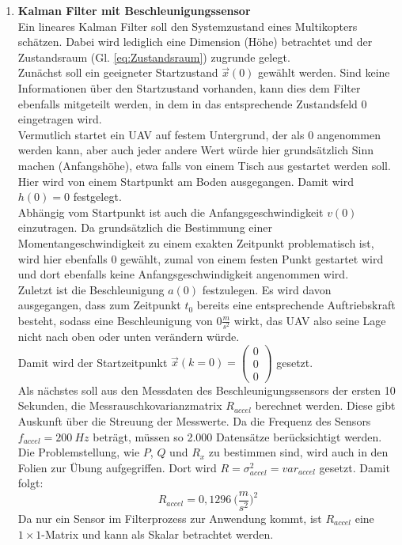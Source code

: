 \documentclass[12pt,a4paper]{article}
\begin{document}
\begin{enumerate}[label=\textbf{\arabic*})]
\begin{enumerate}[label=\textbf{\alph*})]
			\item \textbf{Kalman Filter mit Beschleunigungssensor}\label{subsec:Task1b}\\
			
			Ein lineares Kalman Filter soll den Systemzustand eines Multikopters schätzen. Dabei wird lediglich eine Dimension (Höhe) betrachtet und der Zustandsraum (Gl. \ref{eq:Zustandsraum}) zugrunde gelegt.\\
			
			Zunächst soll ein geeigneter Startzustand $\vec{x}(0)$ gewählt werden. Sind keine Informationen über den Startzustand vorhanden, kann dies dem Filter ebenfalls mitgeteilt werden, in dem in das entsprechende Zustandsfeld $0$ eingetragen wird.\\
			
			Vermutlich startet ein UAV auf festem Untergrund, der als $0$ angenommen werden kann, aber auch jeder andere Wert würde hier grundsätzlich Sinn machen (Anfangshöhe), etwa falls von einem Tisch aus gestartet werden soll. Hier wird von einem Startpunkt am Boden ausgegangen. Damit wird $h(0) = 0$ festgelegt.\\
			
			Abhängig vom Startpunkt ist auch die Anfangsgeschwindigkeit $v(0)$ einzutragen. Da grundsätzlich die Bestimmung einer Momentangeschwindigkeit zu einem exakten Zeitpunkt problematisch ist, wird hier ebenfalls $0$ gewählt, zumal von einem festen Punkt gestartet wird und dort ebenfalls keine Anfangsgeschwindigkeit angenommen wird.\\
			
			Zuletzt ist die Beschleunigung $a(0)$ festzulegen. Es wird davon ausgegangen, dass zum Zeitpunkt $t_{0}$ bereits eine entsprechende Auftriebskraft besteht, sodass eine Beschleunigung von $0 \frac{m}{s^{2}}$ wirkt, das UAV also seine Lage nicht nach oben oder unten verändern würde.\\
			
			Damit wird der Startzeitpunkt $\vec{x}(k=0)=\begin{pmatrix}
				0\\
				0\\
				0
			\end{pmatrix}$
			gesetzt.\\
			
			Als nächstes soll aus den Messdaten des Beschleunigungssensors der ersten 10 Sekunden, die Messrauschkovarianzmatrix $R_{accel}$ berechnet werden. Diese gibt Auskunft über die Streuung der Messwerte. Da die Frequenz des Sensors $f_{accel}=200~Hz$ beträgt, müssen so 2.000 Datensätze berücksichtigt werden. Die Problemstellung, wie $P$, $Q$ und $R_{x}$ zu bestimmen sind, wird auch in den Folien zur Übung aufgegriffen. Dort wird $R=\sigma^{2}_{accel}=var_{accel}$ gesetzt. Damit folgt:
			\begin{equation}\label{eq:Messrauschkovarianzmatrix}
				R_{accel}=0,1296~{(\frac{m}{s^{2}}})^{2}
			\end{equation}
			Da nur ein Sensor im Filterprozess zur Anwendung kommt, ist $R_{accel}$ eine $1\times1$-Matrix und kann als Skalar betrachtet werden.
			

\end{enumerate}
\end{enumerate}
\end{document}
